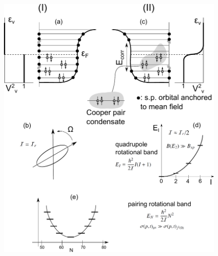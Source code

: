  
 
\begin{figure}
\centerline{\includegraphics*[width=\textwidth,angle=0]{nutshell/figs/fig1A3.pdf}}

\end{figure}
